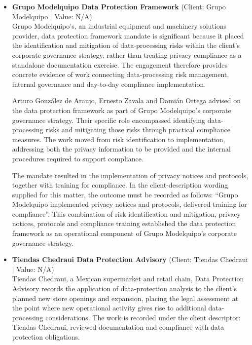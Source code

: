 \documentclass[11pt]{article}
\begin{document}
\begin{itemize}
Arturo González de Araujo, Ernesto Zavala and Damián Ortega led the work. Their contribution connected the regularisation and restructuring of operations to the implementation of policies, protocols and training, ensuring that data protection was embedded as part of Grupo Excelsior’s corporate-governance arrangements. The resulting measures embedded a data protection culture, aligned the relevant operations with regulations, and integrated data protection into corporate governance.
\item \textbf{Grupo Modelquipo Data Protection Framework} (Client: Grupo Modelquipo | Value: N/A)\\ Grupo Modelquipo’s, an industrial equipment and machinery solutions provider, data protection framework mandate is significant because it placed the identification and mitigation of data-processing risks within the client’s corporate governance strategy, rather than treating privacy compliance as a standalone documentation exercise. The engagement therefore provides concrete evidence of work connecting data-processing risk management, internal governance and day-to-day compliance implementation.

Arturo González de Araujo, Ernesto Zavala and Damián Ortega advised on the data protection framework as part of Grupo Modelquipo’s corporate governance strategy. Their specific role encompassed identifying data-processing risks and mitigating those risks through practical compliance measures. The work moved from risk identification to implementation, addressing both the privacy information to be provided and the internal procedures required to support compliance.

The mandate resulted in the implementation of privacy notices and protocols, together with training for compliance. In the client-description wording supplied for this matter, the outcome must be recorded as follows: “Grupo Modelquipo implemented privacy notices and protocols, delivered training for compliance”. This combination of risk identification and mitigation, privacy notices, protocols and compliance training established the data protection framework as an operational component of Grupo Modelquipo’s corporate governance strategy.
\item \textbf{Tiendas Chedraui Data Protection Advisory} (Client: Tiendas Chedraui | Value: N/A)\\ Tiendas Chedraui, a Mexican supermarket and retail chain, Data Protection Advisory records the application of data-protection analysis to the client’s planned new store openings and expansion, placing the legal assessment at the point where new operational activity gives rise to additional data-processing considerations. The work is recorded under the client descriptor: Tiendas Chedraui, reviewed documentation and compliance with data protection obligations.


\end{itemize}
\end{document}
